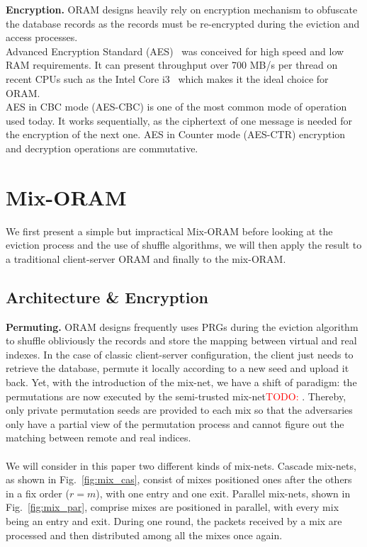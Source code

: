 \documentclass{llncs}
\newcommand{\todo}[1]{\textcolor{red}{TODO: #1}}
\begin{document}
\noindent\textbf{Encryption.}
ORAM designs heavily rely on encryption mechanism to obfuscate the database records as the records must be re-encrypted during the eviction and access processes.\\
Advanced Encryption Standard (AES)~\cite{daemen2013design} was conceived for high speed and low RAM requirements. It can present throughput over 700 MB/s per thread on recent CPUs such as the Intel Core i3~\cite{mcwilliams2014hardware} which makes it the ideal choice for ORAM.\\
AES in CBC mode (AES-CBC) is one of the most common mode of operation used today. It works sequentially, as the ciphertext of one message is needed for the encryption of the next one. 
AES in Counter mode (AES-CTR) encryption and decryption operations are commutative.
%
\section{Mix-ORAM}\label{Mix-ORAM}
We first present a simple but impractical Mix-ORAM before looking at the eviction process and the use of shuffle algorithms, we will then apply the result to a traditional client-server ORAM and finally to the mix-ORAM.
%
\subsection{Architecture \& Encryption}\label{Arch}
%
\noindent\textbf{Permuting.} ORAM designs frequently uses PRGs\cite{ohrimenko2014melbourne} during the eviction algorithm to shuffle obliviously the records and store the mapping between virtual and real indexes.
In the case of classic client-server configuration, the client just needs to retrieve the database, permute it locally according to a new seed and upload it back. Yet, with the introduction of the mix-net, we have a shift of paradigm: the permutations are now executed by the semi-trusted mix-net\todo{}. Thereby, only private permutation seeds are provided to each mix so that the adversaries only have a partial view of the permutation process and cannot figure out the matching between remote and real indices.\\
\\
We will consider in this paper two different kinds of mix-nets. Cascade mix-nets, as shown in Fig.~\ref{fig:mix_cas}, consist of mixes positioned ones after the others in a fix order ($r=m$), with one entry and one exit. Parallel mix-nets, shown in Fig.~\ref{fig:mix_par}, comprise mixes are positioned in parallel, with every mix being an entry and exit. During one round, the packets received by a mix are processed and then distributed among all the mixes once again.\\
\end{document}
